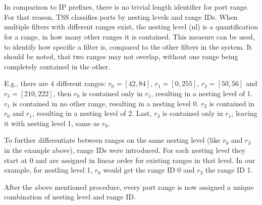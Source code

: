 \documentclass{article}
\begin{document}
    \section{}
    \subsection{}
        In comparison to IP prefixes, there is no trivial length identifier for port range. For that reason, TSS classifies ports by nesting levels and range IDs. When multiple filters with different ranges exist, the nesting level (nl) is a quantification for a range, in how many other ranges it is contained. This measure can be used, to identify how specific a filter is, compared to the other filters in the system. It should be noted, that two ranges may not overlap, without one range being completely contained in the other. 

        E.g., there are 4 different ranges: $r_0 = [42, 84]$, $r_1 = [0, 255]$, $r_2 = [50, 56]$ and $r_3 = [210, 222]$, then $r_0$ is contained only in $r_1$, resulting in a nesting level of 1. $r_1$ is contained in no other range, resulting in a nesting level 0. $r_2$ is contained in $r_0$ and $r_1$, resulting in a nesting level of 2. Last, $r_3$ is contained only in $r_1$, leaving it with nesting level 1, same as $r_0$.

        To further differentiate between ranges on the same nesting level (like $r_0$ and $r_3$ in the example above), range IDs were introduced. For each nesting level they start at 0 and are assigned in linear order for existing ranges in that level. In our example, for nestling level 1, $r_0$ would get the range ID 0 and $r_3$ the range ID 1.

        After the above mentioned procedure, every port range is now assigned a unique combination of nesting level and range ID.
    \subsection{}
        
\end{document}
